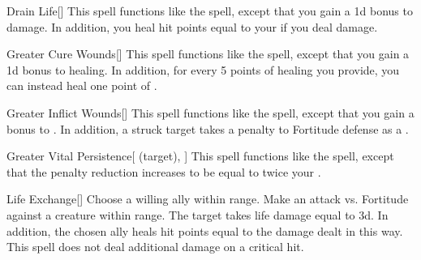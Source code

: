 \lowercase{\hypertarget{spell:Drain Life}{}}\label{spell:Drain Life}
\begin{apability}[\nth{3}]{\hypertarget{spell:Drain Life}{Drain Life}}[]
This spell functions like the  spell, except that you gain a \plus1d bonus to damage.
In addition, you heal hit points equal to your  if you deal damage.
\end{apability}
\vspace{0.25em}



\lowercase{\hypertarget{spell:Greater Cure Wounds}{}}\label{spell:Greater Cure Wounds}
\begin{apability}[\nth{3}]{\hypertarget{spell:Greater Cure Wounds}{Greater Cure Wounds}}[]
This spell functions like the  spell, except that you gain a \plus1d bonus to healing.
In addition, for every 5 points of healing you provide, you can instead heal one point of .
\end{apability}
\vspace{0.25em}



\lowercase{\hypertarget{spell:Greater Inflict Wounds}{}}\label{spell:Greater Inflict Wounds}
\begin{apability}[\nth{3}]{\hypertarget{spell:Greater Inflict Wounds}{Greater Inflict Wounds}}[]
This spell functions like the  spell, except that you gain a  bonus to .
In addition, a struck target takes a  penalty to Fortitude defense as a .
\end{apability}
\vspace{0.25em}



\lowercase{\hypertarget{spell:Greater Vital Persistence}{}}\label{spell:Greater Vital Persistence}
\begin{attuneability}[\nth{4}]{\hypertarget{spell:Greater Vital Persistence}{Greater Vital Persistence}}[ (target), ]
This spell functions like the  spell, except that the penalty reduction increases to be equal to twice your .
\end{attuneability}
\vspace{0.25em}



\lowercase{\hypertarget{spell:Life Exchange}{}}\label{spell:Life Exchange}
\begin{apability}[\nth{4}]{\hypertarget{spell:Life Exchange}{Life Exchange}}[]
Choose a willing ally within \rngmed range.
Make an attack vs. Fortitude against a creature within \rngmed range.
\hit The target takes life damage equal to  \plus3d.
In addition, the chosen ally heals hit points equal to the damage dealt in this way.
\crit This spell does not deal additional damage on a critical hit.
\end{apability}
\vspace{0.25em}



